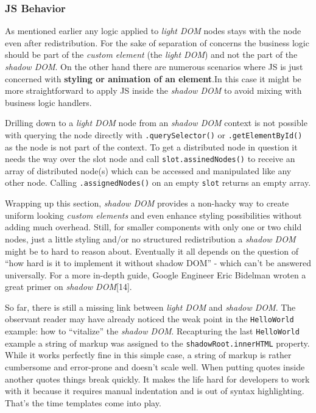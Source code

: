\documentclass[]{assets/latex/ieee}
\begin{document}
\subsubsection{JS Behavior}\label{js-behavior}

As mentioned earlier any logic applied to \emph{light DOM} nodes stays
with the node even after redistribution. For the sake of separation of
concerns the business logic should be part of the \emph{custom element}
(the \emph{light DOM}) and not the part of the \emph{shadow DOM}. On the
other hand there are numerous scenarios where JS is just concerned with
\textbf{styling or animation of an element}.In this case it might be
more straightforward to apply JS inside the \emph{shadow DOM} to avoid
mixing with business logic handlers.

Drilling down to a \emph{light DOM} node from an \emph{shadow DOM}
context is not possible with querying the node directly with
\texttt{.querySelector()} or \texttt{.getElementById()} as the node is
not part of the context. To get a distributed node in question it needs
the way over the slot node and call \texttt{slot.assinedNodes()} to
receive an array of distributed node(s) which can be accessed and
manipulated like any other node. Calling \texttt{.assignedNodes()} on an
empty \texttt{slot} returns an empty array.

Wrapping up this section, \emph{shadow DOM} provides a non-hacky way to
create uniform looking \emph{custom elements} and even enhance styling
possibilities without adding much overhead. Still, for smaller
components with only one or two child nodes, just a little styling
and/or no structured redistribution a \emph{shadow DOM} might be to hard
to reason about. Eventually it all depends on the question of ``how hard
is it to implement it without shadow DOM'' - which can't be answered
universally. For a more in-depth guide, Google Engineer Eric Bidelman
wroten a great primer on \emph{shadow DOM}{[}14{]}.

So far, there is still a missing link between \emph{light DOM} and
\emph{shadow DOM}. The observant reader may have already noticed the
weak point in the \texttt{HelloWorld} example: how to ``vitalize'' the
\emph{shadow DOM}. Recapturing the last \texttt{HelloWorld} example a
string of markup was assigned to the \texttt{shadowRoot.innerHTML}
property. While it works perfectly fine in this simple case, a string of
markup is rather cumbersome and error-prone and doesn't scale well. When
putting quotes inside another quotes things break quickly. It makes the
life hard for developers to work with it because it requires manual
indentation and is out of syntax highlighting. That's the time templates
come into play.
\end{document}
